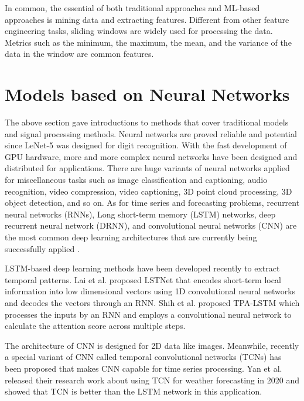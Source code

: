 In common, the essential of both traditional approaches and ML-based approaches is mining data and extracting features. Different from other feature engineering tasks, sliding windows are widely used for processing the data. Metrics such as the minimum, the maximum, the mean, and the variance of the data in the window are common features.

\section{Models based on Neural Networks}

The above section gave introductions to methods that cover traditional models and signal processing methods. Neural networks are proved reliable and potential since LeNet-5 \cite{lecun1998gradient} was designed for digit recognition. With the fast development of GPU hardware, more and more complex neural networks have been designed and distributed for applications. There are huge variants of neural networks applied for miscellaneous tasks such as image classification and captioning, audio recognition, video compression, video captioning, 3D point cloud processing, 3D object detection, and so on. As for time series and forecasting problems, recurrent neural networks (RNNs), Long short-term memory (LSTM) networks, deep recurrent neural network (DRNN), and convolutional neural networks (CNN) are the most common deep learning architectures that are currently being successfully applied \cite{torres2021deep}. 

LSTM-based deep learning methods have been developed recently to extract temporal patterns. Lai et al. proposed LSTNet \cite{lai2018modeling} that encodes short-term local information into low dimensional vectors using 1D convolutional neural networks and decodes the vectors through an RNN. Shih et al. proposed TPA-LSTM \cite{shih2019temporal}  which processes the inputs by an RNN and employs a convolutional neural network to calculate the attention score across multiple steps.

The architecture of CNN is designed for 2D data like images. Meanwhile, recently a special variant of CNN called temporal convolutional networks (TCNs) \cite{lea2016temporal} has been proposed that makes CNN capable for time series processing. Yan et al. \cite{yan2020temporal} released their research work about using TCN for weather forecasting in 2020 and showed that TCN is better than the LSTM network in this application.

